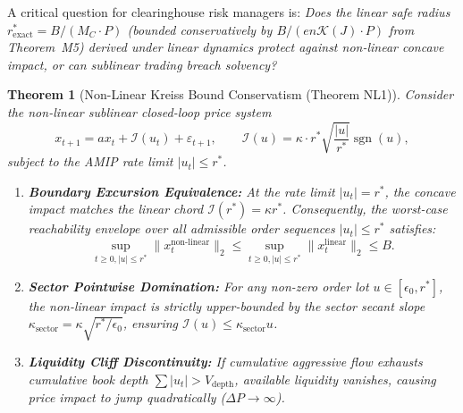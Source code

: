 \documentclass[10pt,twocolumn,letterpaper]{article}
\newtheorem{theorem}{Theorem}[section]
\theoremstyle{definition}
\theoremstyle{remark}
\begin{document}
A critical question for clearinghouse risk managers is: \emph{Does the linear safe radius $r^*_{\text{exact}} = B / (M_C \cdot P)$ (bounded conservatively by $B / (e n \mathcal{K}(J) \cdot P)$ from Theorem~M5) derived under linear dynamics protect against non-linear concave impact, or can sublinear trading breach solvency?}

\begin{theorem}[Non-Linear Kreiss Bound Conservatism (Theorem NL1)]
\label{thm:nonlinear_kreiss}
Consider the non-linear sublinear closed-loop price system
\begin{equation}
x_{t+1} = a x_t + \mathcal{I}(u_t) + \varepsilon_{t+1}, \qquad \mathcal{I}(u) = \kappa \cdot r^* \sqrt{\frac{|u|}{r^*}} \operatorname{sgn}(u),
\end{equation}
subject to the AMIP rate limit $|u_t| \le r^*$. 
\begin{enumerate}
    \item \textbf{Boundary Excursion Equivalence:} At the rate limit $|u_t| = r^*$, the concave impact matches the linear chord $\mathcal{I}(r^*) = \kappa r^*$. Consequently, the worst-case reachability envelope over all admissible order sequences $|u_t| \le r^*$ satisfies:
    \begin{equation}
    \sup_{t \ge 0, |u| \le r^*} \|x_t^{\text{non-linear}}\|_2 \le \sup_{t \ge 0, |u| \le r^*} \|x_t^{\text{linear}}\|_2 \le B.
    \end{equation}
    \item \textbf{Sector Pointwise Domination:} For any non-zero order lot $u \in [\epsilon_0, r^*]$, the non-linear impact is strictly upper-bounded by the sector secant slope $\kappa_{\text{sector}} = \kappa \sqrt{r^* / \epsilon_0}$, ensuring $\mathcal{I}(u) \le \kappa_{\text{sector}} u$.
    \item \textbf{Liquidity Cliff Discontinuity:} If cumulative aggressive flow exhausts cumulative book depth $\sum |u_t| > V_{\text{depth}}$, available liquidity vanishes, causing price impact to jump quadratically ($\Delta P \to \infty$).
\end{enumerate}
\end{theorem}
\end{document}

